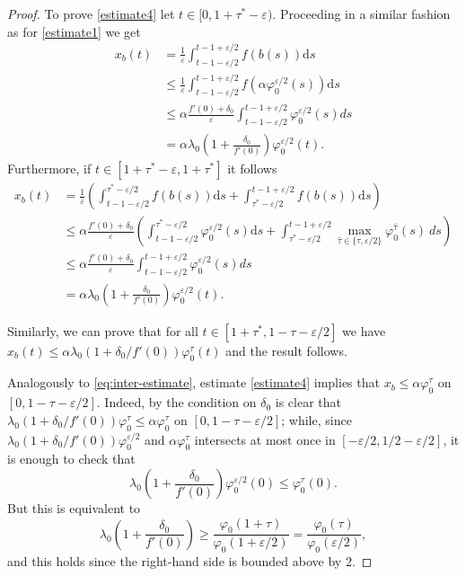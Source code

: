 \documentclass[a4paper,11pt]{article}
\theoremstyle{plain}
\theoremstyle{definition}
\theoremstyle{definition}
\newcommand{\dd}{\mathrm{d}}
\numberwithin{equation}{section}
\begin{document}
\begin{proof}
To prove \eqref{estimate4} let $t\in[0,1+\tau^*-\varepsilon)$. Proceeding in a similar fashion as for \eqref{estimate1} we get
\begin{align*}
    x_b(t) &= \frac{1}{\varepsilon}\int_{t-1-\varepsilon/2}^{t-1+\varepsilon/2} f(b(s))\dd s\\
    &\leq \frac{1}{\varepsilon}\int_{t-1-\varepsilon/2}^{t-1+\varepsilon/2} f(\alpha\varphi_0^{\varepsilon/2}(s))\dd s \\
    &\leq \alpha \frac{f'(0)+\delta_0}{\varepsilon} \int_{t-1-\varepsilon/2}^{t-1+\varepsilon/2} \varphi_0^{\varepsilon/2}(s) ds \\
    &= \alpha \lambda_0\left( 1+\frac{\delta_0}{f'(0)} \right) \varphi_0^{\varepsilon/2}(t).
\end{align*}
Furthermore, if $t\in[1+\tau^*-\varepsilon,1+\tau^*]$ it follows
\begin{align*}
    x_b(t) &= \frac{1}{\varepsilon} \left( \int_{t-1-\varepsilon/2}^{\tau^*-\varepsilon/2} f(b(s))\dd s + \int_{\tau^*-\varepsilon/2}^{t-1+\varepsilon/2} f(b(s)) \dd s\right) \\
    &\leq \alpha\frac{f'(0)+\delta_0}{\varepsilon} \left( \int_{t-1-\varepsilon/2}^{\tau^*-\varepsilon/2} \varphi_0^{\varepsilon/2}(s)\dd s + \int_{\tau^*-\varepsilon/2}^{t-1+\varepsilon/2} \max_{\hat{\tau}\in\{ \tau,\varepsilon/2 \}} \varphi_0^{\hat{\tau}}(s)  ~ ds \right) \\
    &\leq \alpha\frac{f'(0)+\delta_0}{\varepsilon} \int_{t-1-\varepsilon/2}^{t-1+\varepsilon/2} \varphi_0^{\varepsilon/2}(s) ds \\
    &= \alpha \lambda_0\left( 1+\frac{\delta_0}{f'(0)} \right) \varphi_0^{\varepsilon/2}(t).
\end{align*}

Similarly, we can prove that for all $t\in[1+\tau^*,1-\tau-\varepsilon/2]$ we have $x_b(t)\leq \alpha\lambda_0(1+\delta_0/f'(0))\varphi_0^{\tau}(t)$ and the result follows.

Analogously to \eqref{eq:inter-estimate}, estimate \eqref{estimate4} implies that $x_b \leq \alpha\varphi_0^\tau$ on $[0,1-\tau-\varepsilon/2]$. Indeed, by the condition on $\delta_0$ is clear that $\lambda_0(1+\delta_0/f'(0)) \varphi_0^\tau \leq \alpha \varphi_0^\tau$ on $[0,1-\tau-\varepsilon/2]$; while, since $\lambda_0(1+\delta_0/f'(0)) \varphi_0^{\varepsilon/2}$ and $\alpha\varphi_0^\tau$ intersects at most once in $[-\varepsilon/2, 1/2 - \varepsilon/2]$, it is enough to check that
\[
    \lambda_0\left( 1+\frac{\delta_0}{f'(0)} \right) \varphi_0^{\varepsilon/2}(0) \leq \varphi_0^\tau(0).
\]
But this is equivalent to
\[
    \lambda_0\left( 1+\frac{\delta_0}{f'(0)} \right) \geq \frac{\varphi_0(1+\tau)}{\varphi_0(1+\varepsilon/2)}= \frac{\varphi_0(\tau)}{\varphi_0(\varepsilon/2)},
\]
and this holds since the right-hand side is bounded above by 2.


\end{proof}
\end{document}
